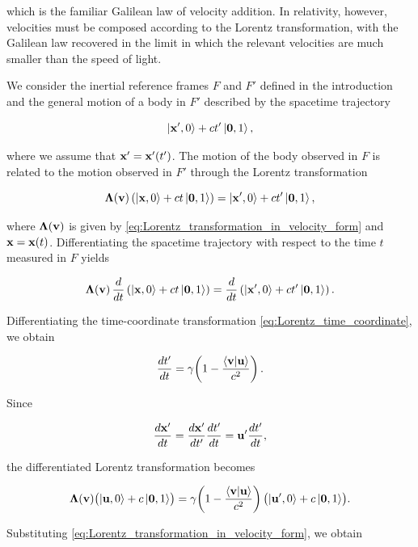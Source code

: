 \documentclass[12pt]{article}
\begin{document}
which is the familiar Galilean law of velocity addition. In relativity, however, velocities
must be composed according to the Lorentz transformation, with the Galilean law recovered
in the limit in which the relevant velocities are much smaller than the speed of light.

We consider the inertial reference frames $F$ and $F'$ defined in the introduction and the
general motion of a body in $F'$ described by the spacetime trajectory

\[
  \ket{\vb{x}',0} + ct'\ket{\vb{0},1},
\]

where we assume that $\vb{x}' = \vb{x}'(t')$. The motion of the body observed in $F$ is
related to the motion observed in $F'$ through the Lorentz transformation

\[
  \boldsymbol{\Lambda}(\vb{v})
  \left(
    \ket{\vb{x},0} + ct\ket{\vb{0},1}
  \right)
  =
  \ket{\vb{x}',0} + ct'\ket{\vb{0},1},
\]

where $\boldsymbol{\Lambda}(\vb{v})$ is given by
\eqref{eq:Lorentz_transformation_in_velocity_form} and $\vb{x}=\vb{x}(t)$.
Differentiating the spacetime trajectory with respect to the
time $t$ measured in $F$ yields

\[
  \boldsymbol{\Lambda}(\vb{v})\,
  \frac{d}{dt}
  \left(
    \ket{\vb{x},0} + ct\ket{\vb{0},1}
  \right)
  =
  \frac{d}{dt}
  \left(
    \ket{\vb{x}',0} + ct'\ket{\vb{0},1}
  \right).
\]


Differentiating the time-coordinate transformation
\eqref{eq:Lorentz_time_coordinate}, we obtain

\begin{equation}
  \frac{dt'}{dt}
  =
  \gamma\!\left(
    1-\frac{\ip{\vb{v}}{\vb{u}}}{c^2}
  \right).
  \label{eq:time_derivative_velocity_composition}
\end{equation}

Since

\[
  \frac{d\vb{x}'}{dt}
  =
  \frac{d\vb{x}'}{dt'}\frac{dt'}{dt}
  =
  \vb{u}'\frac{dt'}{dt},
\]

the differentiated Lorentz transformation becomes

\[
  \boldsymbol{\Lambda}(\vb{v})
  \bigl(
    \ket{\vb{u},0}+c\ket{\vb{0},1}
  \bigr)
  =
  \gamma\!\left(
    1-\frac{\ip{\vb{v}}{\vb{u}}}{c^2}
  \right)
  \bigl(
    \ket{\vb{u}',0}+c\ket{\vb{0},1}
  \bigr).
\]

Substituting \eqref{eq:Lorentz_transformation_in_velocity_form}, we obtain
\end{document}
